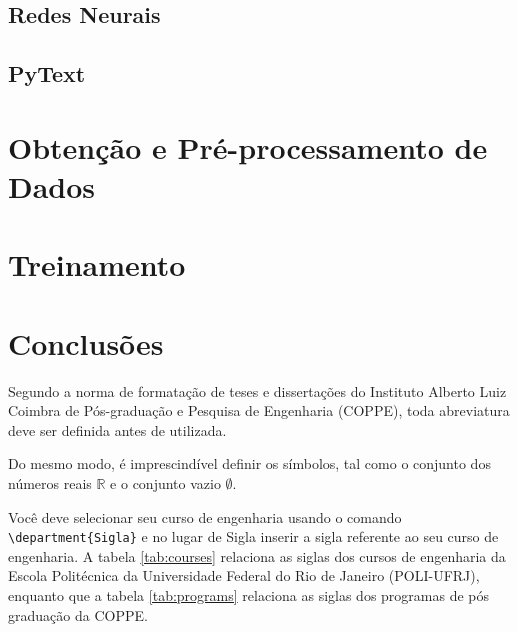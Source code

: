 \documentclass[grad,numbers]{coppe}
\begin{document}
  \section{Redes Neurais}
  \section{PyText}
  
  \chapter{Obtenção e Pré-processamento de Dados}
  
  
  
  \chapter{Treinamento}
  
  
  
  \chapter{Conclusões}
  
  Segundo a norma de formatação de teses e dissertações do
  Instituto Alberto Luiz Coimbra de Pós-graduação e Pesquisa de
  Engenharia (COPPE), toda abreviatura deve ser definida antes de
  utilizada.
  
  Do mesmo modo, é imprescindível definir os símbolos, tal como o
  conjunto dos números reais $\mathbb{R}$ e o conjunto vazio $\emptyset$.
  
  Você deve selecionar seu curso de engenharia usando o comando \texttt{\textbackslash department\{Sigla\}} e no lugar de Sigla inserir a sigla referente ao seu curso de engenharia. A tabela \ref{tab:courses} relaciona as siglas dos cursos de engenharia da Escola Politécnica da Universidade Federal do Rio de Janeiro (POLI-UFRJ), enquanto que a tabela \ref{tab:programs} relaciona as siglas dos programas de pós graduação da COPPE.
  
\end{document}
